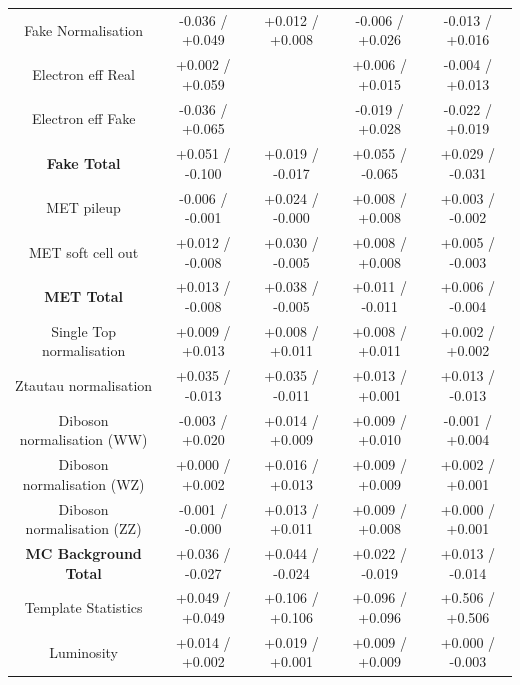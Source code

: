 \begin{table}[htbp]
\begin{center}
\begin{tabular}{|c|c|c|c|c|}
   Fake Normalisation                    &  -0.036   / +0.049   & +0.012   / +0.008   & -0.006   / +0.026   & -0.013   / +0.016   \\
   Electron eff Real                     &  +0.002   / +0.059   &       & +0.006   / +0.015   & -0.004   / +0.013   \\
   Electron eff Fake                     &  -0.036   / +0.065   &      & -0.019   / +0.028   & -0.022   / +0.019   \\
   \hline
   \textbf{Fake Total}                   &  +0.051   / -0.100   & +0.019   / -0.017   & +0.055   / -0.065   & +0.029   / -0.031   \\
   \hline
   MET pileup                            &  -0.006   / -0.001   & +0.024   / -0.000   & +0.008   / +0.008   & +0.003   / -0.002   \\
   MET soft cell out                     &  +0.012   / -0.008   & +0.030   / -0.005   & +0.008   / +0.008   & +0.005   / -0.003   \\
   \hline
   \textbf{MET Total}                    &  +0.013   / -0.008   & +0.038   / -0.005   & +0.011   / -0.011   & +0.006   / -0.004   \\
   \hline
   Single Top normalisation              &  +0.009   / +0.013   & +0.008   / +0.011   & +0.008   / +0.011   & +0.002   / +0.002   \\
   Ztautau normalisation                 &  +0.035   / -0.013   & +0.035   / -0.011   & +0.013   / +0.001   & +0.013   / -0.013   \\
   Diboson normalisation (WW)            &  -0.003   / +0.020   & +0.014   / +0.009   & +0.009   / +0.010   & -0.001   / +0.004   \\
   Diboson normalisation (WZ)            &  +0.000   / +0.002   & +0.016   / +0.013   & +0.009   / +0.009   & +0.002   / +0.001   \\
   Diboson normalisation (ZZ)            &  -0.001   / -0.000   & +0.013   / +0.011   & +0.009   / +0.008   & +0.000   / +0.001   \\
   \hline
   \textbf{MC Background Total}          &  +0.036   / -0.027   & +0.044   / -0.024   & +0.022   / -0.019   & +0.013   / -0.014   \\
   \hline
   Template Statistics                   &  +0.049   / +0.049   & +0.106   / +0.106   & +0.096   / +0.096   & +0.506   / +0.506   \\
   Luminosity                            &  +0.014   / +0.002   & +0.019   / +0.001   & +0.009   / +0.009   & +0.000   / -0.003   \\

\end{tabular}
\end{center}
\end{table}

